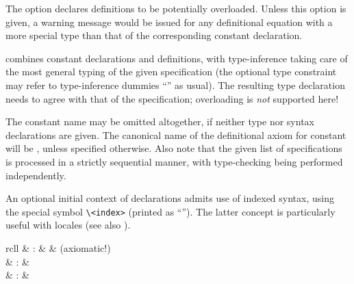 \begin{isabellebody}
\begin{isamarkuptext}
\begin{description}
  The  option declares definitions to be
  potentially overloaded.  Unless this option is given, a warning
  message would be issued for any definitional equation with a more
  special type than that of the corresponding constant declaration.
  
  \item \hyperlink{command.constdefs}{\mbox{}} combines constant declarations and
  definitions, with type-inference taking care of the most general
  typing of the given specification (the optional type constraint may
  refer to type-inference dummies ``\isa{{\isacharunderscore}}'' as usual).  The
  resulting type declaration needs to agree with that of the
  specification; overloading is \emph{not} supported here!
  
  The constant name may be omitted altogether, if neither type nor
  syntax declarations are given.  The canonical name of the
  definitional axiom for constant  will be ,
  unless specified otherwise.  Also note that the given list of
  specifications is processed in a strictly sequential manner, with
  type-checking being performed independently.
  
  An optional initial context of  declarations
  admits use of indexed syntax, using the special symbol \verb|\<index>| (printed as ``\isa{{\isachardoublequote}{\isasymindex}{\isachardoublequote}}'').  The latter concept is
  particularly useful with locales (see also ).

  \end{description}%
\end{isamarkuptext}%
\isamarkuptrue%
%
\isamarkuptrue%
%
\begin{isamarkuptext}%
\begin{matharray}{rcll}
    \hypertarget{command.axioms}{\hyperlink{command.axioms}{\mbox{}}} & : &  & (axiomatic!) \\
    \hypertarget{command.lemmas}{\hyperlink{command.lemmas}{\mbox{}}} & : &  \\
    \hypertarget{command.theorems}{\hyperlink{command.theorems}{\mbox{}}} & : &  \\
  \end{matharray}


\end{isamarkuptext}
\end{isabellebody}
